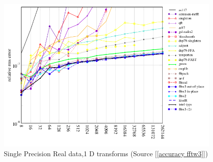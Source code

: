\begin{figure}[!h]
\centering
\includegraphics[scale=0.45]{figures/singlefftw.png}
\caption{Single Precision Real data,1 D transforms (Source [\ref{accuracy fftw3}])}
\label{fig:singlea}
\end{figure}